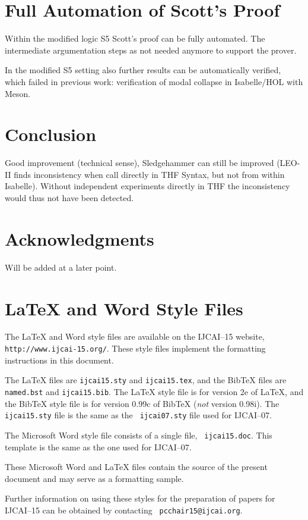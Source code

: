 \documentclass{article}
\begin{document}
\section{Full Automation of Scott's Proof}
Within the modified logic S5 Scott's proof can be fully automated. The
intermediate argumentation steps as not needed anymore to support the
prover.

In the modified S5 setting also further results can be automatically verified, which 
failed in previous work: verification of  modal collapse in
Isabelle/HOL with Meson.

\section{Conclusion}


Good improvement (technical sense), Sledgehammer can still be improved
(LEO-II finds inconsistency when call directly in THF Syntax, but not
from within Isabelle). Without independent experiments directly in THF 
the inconsistency would thus not have been detected.

\section*{Acknowledgments}

Will be added at a later point.


\appendix

\section{\LaTeX{} and Word Style Files}\label{stylefiles}

The \LaTeX{} and Word style files are available on the IJCAI--15
website, {\tt http://www.ijcai-15.org/}.
These style files implement the formatting instructions in this
document.

The \LaTeX{} files are {\tt ijcai15.sty} and {\tt ijcai15.tex}, and
the Bib\TeX{} files are {\tt named.bst} and {\tt ijcai15.bib}. The
\LaTeX{} style file is for version 2e of \LaTeX{}, and the Bib\TeX{}
style file is for version 0.99c of Bib\TeX{} ({\em not} version
0.98i). The {\tt ijcai15.sty} file is the same as the {\tt
ijcai07.sty} file used for IJCAI--07.

The Microsoft Word style file consists of a single file, {\tt
ijcai15.doc}. This template is the same as the one used for
IJCAI--07.

These Microsoft Word and \LaTeX{} files contain the source of the
present document and may serve as a formatting sample.  

Further information on using these styles for the preparation of
papers for IJCAI--15 can be obtained by contacting {\tt
pcchair15@ijcai.org}.



\end{document}
